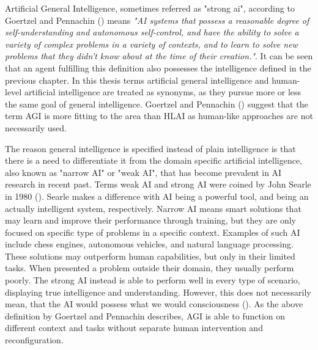 \documentclass[utf8,english]{gradu3}
\begin{document}


Artificial General Intelligence, sometimes referred as "strong ai", according to
Goertzel and Pennachin (\cite*{goertzel2007}) means \emph{"AI systems that
possess a reasonable degree of self-understanding and autonomous self-control,
and have the ability to solve a variety of complex problems in a variety of
contexts, and to learn to solve new problems that they didn't know about at the
time of their creation."}. It can be seen that an agent fulfilling this
definition also possesses the intelligence defined in the previous chapter. In
this thesis terms artificial general intelligence and human-level artificial
intelligence are treated as synonyms, as they pursue more or less the same goal
of general intelligence. Goertzel and Pennachin (\cite*{goertzel2007}) suggest
that the term AGI is more fitting to the area than HLAI as human-like approaches
are not necessarily used.

The reason general intelligence is specified instead of plain intelligence is
that there is a need to differentiate it from the domain specific artificial
intelligence, also known as "narrow AI" or "weak AI", that has become prevalent
in AI research in recent past. Terms weak AI and strong AI were coined by John
Searle in 1980 (\cite{searle1980}). Searle makes a difference with AI being a
powerful tool, and being an actually intelligent system, respectively. Narrow AI
means smart solutions that may learn and improve their performance through
training, but they are only focused on specific type of problems in a specific
context. Examples of such AI include chess engines, autonomous vehicles, and
natural language processing. These solutions may outperform human capabilities,
but only in their limited tasks. When presented a problem outside their domain,
they usually perform poorly. The strong AI instead is able to perform well in
every type of scenario, displaying true intelligence and understanding. However,
this does not necessarily mean, that the AI would possess what we would
consciousness (\cite{searle1980}). As the above definition by Goertzel and
Pennachin describes, AGI is able to function on different context and tasks
without separate human intervention and reconfiguration.
\end{document}
